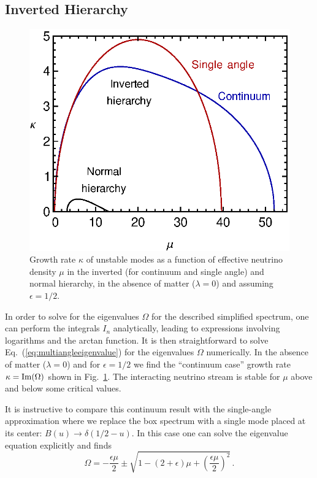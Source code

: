 \documentclass[twocolumn,prd,showpacs,
floatfix,preprintnumbers,nofootinbib]{revtex4}
\begin{document}
\subsection{Inverted Hierarchy}
\begin{figure}[b]
\includegraphics[width=0.8\columnwidth]{single1.eps}
\caption{Growth rate $\kappa$ of unstable modes as a function of
effective neutrino density $\mu$ in the inverted (for continuum and single angle) and normal hierarchy,
in the absence of matter ($\lambda=0$) and assuming $\epsilon=1/2$.
\label{fig:single1}}
\end{figure}

In order to solve for the eigenvalues $\Omega$ for the described 
simplified spectrum, one can perform the integrals $I_n$ analytically, leading to expressions involving logarithms and the arctan function. It is then straightforward to solve Eq.~(\ref{eq:multiangleeigenvalue}) for the eigenvalues $\Omega$ numerically. In the absence of
matter ($\lambda=0$) and for $\epsilon=1/2$ we find the ``continuum
case'' growth rate $\kappa={\rm Im}(\Omega)$ shown in
Fig.~\ref{fig:single1}. The interacting neutrino stream is stable
for $\mu$ above and below some critical values.

It is instructive to compare this continuum result with the
single-angle approximation where we replace the box spectrum with a
single mode placed at its center: $B(u)\to\delta(1/2-u)$. In this
case one can solve the eigenvalue equation explicitly and finds
\begin{equation}
\Omega=-\frac{\epsilon\mu}{2}\pm
\sqrt{1-(2+\epsilon)\mu+\left(\frac{\epsilon\mu}{2}\right)^2}\,.
\end{equation}
\end{document}

